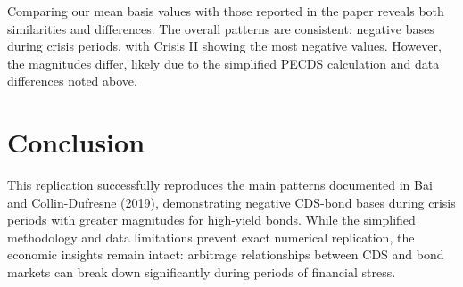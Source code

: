 \documentclass{article}
\begin{document}
Comparing our mean basis values with those reported in the paper reveals both similarities and differences. The overall patterns are consistent: negative bases during crisis periods, with Crisis II showing the most negative values. However, the magnitudes differ, likely due to the simplified PECDS calculation and data differences noted above.

\section{Conclusion}

This replication successfully reproduces the main patterns documented in Bai and Collin-Dufresne (2019), demonstrating negative CDS-bond bases during crisis periods with greater magnitudes for high-yield bonds. While the simplified methodology and data limitations prevent exact numerical replication, the economic insights remain intact: arbitrage relationships between CDS and bond markets can break down significantly during periods of financial stress.
\end{document}
